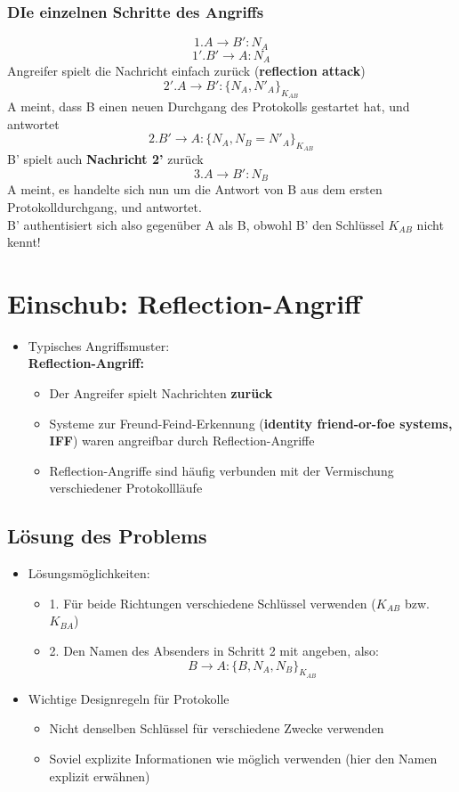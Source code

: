 \documentclass[openany]{book}
\begin{document}
\subsubsection{DIe einzelnen Schritte des Angriffs}

$$1. A\rightarrow B':N_A$$ $$1'.B'\rightarrow A:N_A$$ Angreifer spielt die Nachricht einfach zurück (\textbf{reflection attack}) $$2'.A\rightarrow B':\{ N_A,N'_A\} _{K_{AB}}$$ A meint, dass B einen neuen Durchgang des Protokolls gestartet hat, und antwortet $$2.B'\rightarrow A:\{ N_A,N_B = N'_A\}_{K_{AB}}$$ B' spielt auch \textbf{Nachricht 2'} zurück $$3.A\rightarrow B':N_B$$ A meint, es handelte sich nun um die Antwort von B aus dem ersten Protokolldurchgang, und antwortet. \\ B' authentisiert sich also gegenüber A als B, obwohl B' den Schlüssel $K_{AB}$ nicht kennt!

\section{Einschub: Reflection-Angriff}

\begin{itemize}
    \item Typisches Angriffsmuster: \\ \textbf{Reflection-Angriff:}
    \begin{itemize}
        \item Der Angreifer spielt Nachrichten \textbf{zurück}
        \item Systeme zur Freund-Feind-Erkennung (\textbf{identity friend-or-foe systems, IFF}) waren angreifbar durch Reflection-Angriffe
        \item  Reflection-Angriffe sind häufig verbunden mit der Vermischung verschiedener Protokollläufe
    \end{itemize}
\end{itemize}

\subsection{Lösung des Problems}

\begin{itemize}
    \item Lösungsmöglichkeiten:
    \begin{itemize}
        \item 1. Für beide Richtungen verschiedene Schlüssel verwenden ($K_{AB}$ bzw. $K_{BA}$)
        \item 2. Den Namen des Absenders in Schritt 2 mit angeben, also: $$B\rightarrow A:\{ B,N_A,N_B\}_{K_{AB}}$$
    \end{itemize}
    \item Wichtige Designregeln für Protokolle
    \begin{itemize}
        \item Nicht denselben Schlüssel für verschiedene Zwecke verwenden
        \item Soviel explizite Informationen wie möglich verwenden (hier den Namen explizit erwähnen)
    \end{itemize}
\end{itemize}
\end{document}
